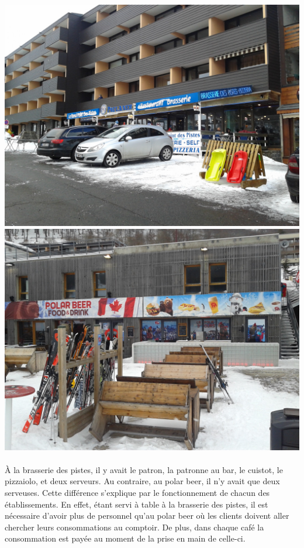 \begin{center}
	\includegraphics[scale=0.15]{brasserieDesPistes.jpg}
	\includegraphics[scale=0.15]{PolarBeer.jpg}
\end{center}

\paragraph{} À la brasserie des pistes, il y avait le patron, la patronne au
bar, le cuistot, le pizzaiolo, et deux serveurs. Au contraire, au polar beer,
il n'y avait que deux serveuses. Cette différence s'explique par le
fonctionnement de chacun des établissements. En effet, étant servi à table à la
brasserie des pistes, il est nécessaire d'avoir plus de personnel qu'au polar
beer où les clients doivent aller chercher leurs consommations au comptoir. De
plus, dans chaque café la consommation est payée au moment de la prise en main
de celle-ci.

